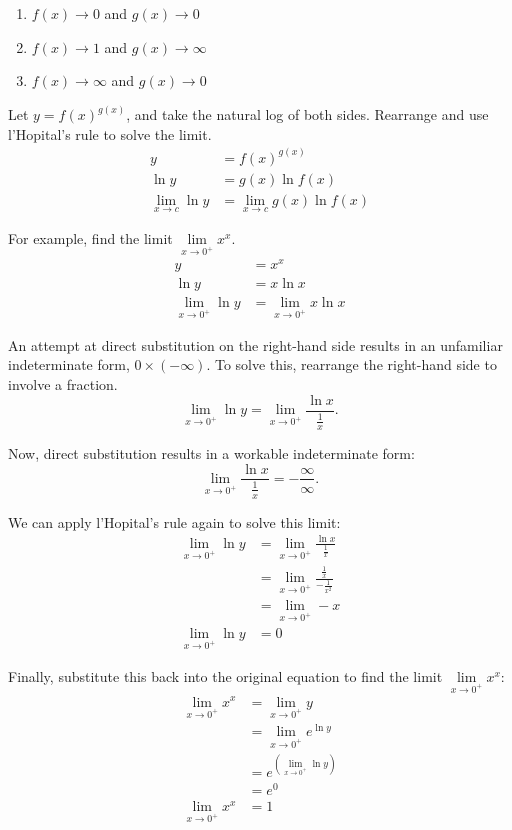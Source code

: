 \documentclass[12pt]{article}
\begin{document}
\begin{enumerate}
	\item $f(x) \to 0$ and $g(x) \to 0$
	\item $f(x) \to 1$ and $g(x) \to \infty$
	\item $f(x) \to \infty$ and $g(x) \to 0$
\end{enumerate}

Let $y = f(x)^{g(x)}$, and take the natural log of both sides. Rearrange and use l'Hopital's rule to solve the limit.
\begin{align*}
	y &= f(x)^{g(x)} \\
	\ln y &= g(x) \ln f(x) \\
	\lim_{x \to c} \ln y &= \lim_{x \to c} g(x) \ln f(x)
\end{align*}

\noindent For example, find the limit $\lim \limits_{x \to 0^+} x^x$.
\begin{align*}
	y &= x^x \\
	\ln y &= x \ln x \\
	\lim_{x \to 0^+} \ln y &= \lim_{x \to 0^+} x \ln x
\end{align*}

\noindent An attempt at direct substitution on the right-hand side results in an unfamiliar indeterminate form, $0 \times (- \infty)$. To solve this, rearrange the right-hand side to involve a fraction.
\[ \lim_{x \to 0^+} \ln y = \lim_{x \to 0^+} \frac{\ln x}{\frac{1}{x}}. \]

\noindent Now, direct substitution results in a workable indeterminate form:
\[ \lim_{x \to 0^+} \frac{\ln x}{\frac{1}{x}} = -\frac{\infty}{\infty}. \]

\noindent We can apply l'Hopital's rule again to solve this limit:
\begin{align*}
	\lim_{x \to 0^+} \ln y &= \lim_{x \to 0^+} \frac{\ln x}{\frac{1}{x}} \\[5pt]
	&= \lim_{x \to 0^+} \frac{\frac{1}{x}}{-\frac{1}{x^2}} \\[5pt]
	&= \lim_{x \to 0^+} -x \\
	\lim_{x \to 0^+} \ln y &= 0
\end{align*}

\noindent Finally, substitute this back into the original equation to find the limit $\lim \limits_{x \to 0^+} x^x$:
\begin{align*}
	\lim_{x \to 0^+} x^x &= \lim_{x \to 0^+} y \\
	&= \lim_{x \to 0^+} e^{\ln y} \\
	&= e^{\left( \lim \limits_{x \to 0^+} \ln y \right)} \\
	&= e^0 \\
	\lim_{x \to 0^+} x^x &= 1
\end{align*}
\end{document}
